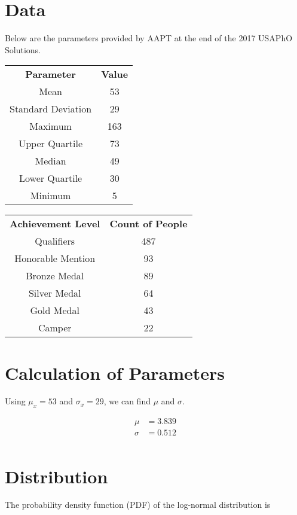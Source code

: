 \documentclass{article}
\begin{document}
\section{Data}
Below are the parameters provided by AAPT at the end of the 2017 USAPhO Solutions.


\begin{center}
    \begin{tabular}{ c c }
     \textbf{Parameter} & \textbf{Value}\\ 
     Mean &  53 \\  
     Standard Deviation & 29 \\    
     Maximum & 163 \\
     Upper Quartile & 73 \\
     Median & 49 \\
     Lower Quartile & 30 \\
     Minimum & 5 \\
    \end{tabular}
\end{center}

\begin{center}
    \begin{tabular}{ c c }
     \textbf{Achievement Level} & \textbf{Count of People}\\ 
     Qualifiers & 487 \\  
     Honorable Mention & 93 \\    
     Bronze Medal & 89 \\
     Silver Medal & 64 \\
     Gold Medal & 43 \\
     Camper & 22 \\
    \end{tabular}
\end{center}

\section{Calculation of Parameters}
Using $\mu_x = 53$ and $\sigma_x = 29$, we can find $\mu$ and $\sigma$.

\begin{align*}
    \mu &= 3.839 \\
    \sigma &= 0.512 \\
\end{align*}

\section{Distribution}
The probability density function (PDF) of the log-normal distribution is
\end{document}

